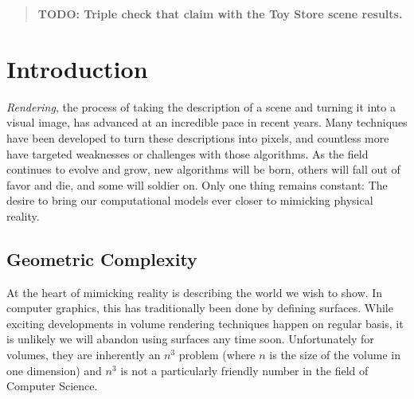 \documentclass[12pt]{ucthesis}
\begin{document}
\begin{frontmatter}
\begin{abstract}
\textbf{TODO: Triple check that claim with the Toy Store scene results.}

\end{abstract}





\tableofcontents


\listoftables

\listoffigures

\end{frontmatter}

\pagestyle{plain}




\renewcommand{\baselinestretch}{1.66}







\chapter{Introduction}
\label{intro}

\emph{Rendering}, the process of taking the description of a scene and turning
it into a visual image, has advanced at an incredible pace in recent
years. Many techniques have been developed to turn these descriptions into
pixels, and countless more have targeted weaknesses or challenges with those
algorithms. As the field continues to evolve and grow, new algorithms will be
born, others will fall out of favor and die, and some will soldier on. Only
one thing remains constant: The desire to bring our computational models ever
closer to mimicking physical reality.

\section{Geometric Complexity}
\label{complexity}

At the heart of mimicking reality is describing the world we wish to show. In
computer graphics, this has traditionally been done by defining surfaces. While
exciting developments in volume rendering techniques happen on regular basis,
it is unlikely we will abandon using surfaces any time soon. Unfortunately for
volumes, they are inherently an $n^3$ problem (where $n$ is the size of the
volume in one dimension) and $n^3$ is not a particularly friendly number in the
field of Computer Science.
\end{document}
